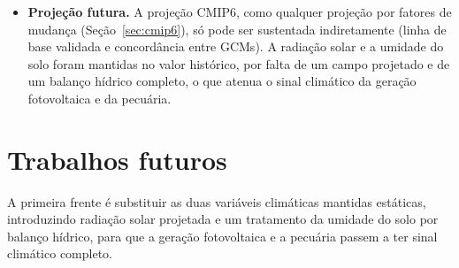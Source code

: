 \begin{itemize}
    (Tabela~\ref{tab:realized-composition}): uma área medida, e não uma classe ausente, mas
    pequena demais para ancorar limiares ou para validar presença. A isso se soma o fato de que
    a piscicultura é \emph{ao mesmo tempo} o único segmento
    que ganha área apta sob o clima projetado e o único cuja correlação municipal com o \emph{proxy}
    de produtividade é negativa ($\rho = -0{,}30$ na metade de validação). As duas coisas são
    consistentes, pois o validador de NPP mede vegetação terrestre e nada diz sobre aquicultura.
    Juntas, porém, significam que o segmento de maior ganho projetado é também o de menor sustentação
    empírica. A calibração da piscicultura permanece ancorada na terra genericamente
    \emph{disponível}, e não no nicho realizado, e, pela mesma razão, nenhum validador de presença
    (Boyce/AUC) é apresentado para esse segmento. Para resolver essa lacuna, seria necessário um
    mapeamento específico dos viveiros de piscicultura em GO~e~DF.
  \item \textbf{Projeção futura.} A projeção CMIP6, como qualquer projeção por fatores de
    mudança (Seção~\ref{sec:cmip6}), só pode ser sustentada indiretamente (linha de base validada e
    concordância entre GCMs). A radiação solar e a umidade do solo foram mantidas no valor histórico,
    por falta de um campo projetado e de um balanço hídrico completo, o que atenua o sinal climático
    da geração fotovoltaica e da pecuária.
\end{itemize}

\section{Trabalhos futuros}\label{sec:futurework}

A primeira frente é substituir as duas variáveis climáticas mantidas estáticas, introduzindo
radiação solar projetada e um tratamento da umidade do solo por balanço hídrico, para que a
geração fotovoltaica e a pecuária passem a ter sinal climático completo.

